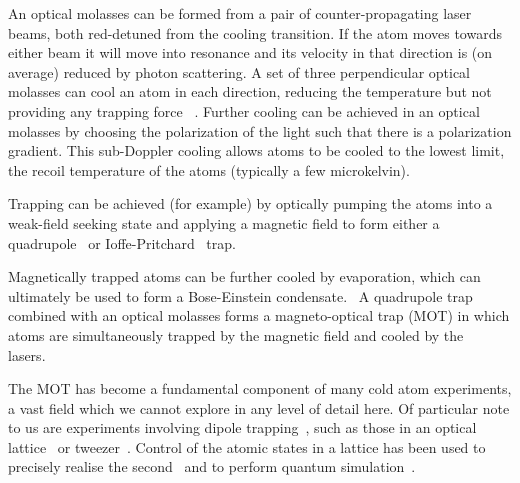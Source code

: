
An optical molasses can be formed from a pair of counter-propagating laser
beams, both red-detuned from the cooling transition. If the atom moves towards
either beam it will move into resonance and its velocity in that direction
is (on average) reduced by photon scattering. 
A set of three perpendicular optical molasses can cool an atom
in each direction, reducing the temperature but not providing any trapping
force~\cite{Metcalf1999} . Further cooling can be achieved in an optical
molasses by choosing the polarization of the light such that there is a
polarization gradient. This sub-Doppler cooling allows atoms to be cooled to the
lowest limit, the recoil temperature of the atoms (typically a few
microkelvin).~\cite{Dalibard:89}

Trapping can be achieved (for example) by optically pumping the atoms into a
weak-field seeking state and applying a magnetic field to form either a
quadrupole~\cite{PhysRevLett.54.2596} or
Ioffe-Pritchard~\cite{PhysRevLett.51.1336} trap.


Magnetically trapped atoms can
be further cooled by evaporation, which can ultimately be used to form a
Bose-Einstein condensate.~\cite{Anderson198} A quadrupole trap combined with an
optical molasses forms a magneto-optical trap (MOT) in which atoms are
simultaneously trapped by the magnetic field and cooled by the
lasers.~\cite{PhysRevLett.59.2631}

The MOT has become a fundamental component of many cold atom experiments, a vast
field which we cannot explore in any level of detail here. Of particular note to
us are experiments involving dipole trapping~\cite{PhysRevA.47.R4567}, such as
those in an optical lattice~\cite{Bakr2009} or tweezer~\cite{Ashkin:86}. Control
of the atomic states in a lattice has been used to precisely realise the
second~\cite{PhysRevLett.120.103201} and to perform quantum
simulation~\cite{Gross995}.

